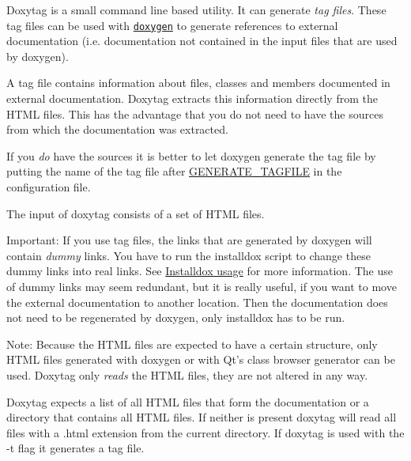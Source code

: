 Doxytag is a small command line based utility. It can generate {\itshape tag files\/}. These tag files can be used with \href{doxygen_usage.html}{\tt doxygen} to generate references to external documentation (i.e. documentation not contained in the input files that are used by doxygen).

A tag file contains information about files, classes and members documented in external documentation. Doxytag extracts this information directly from the HTML files. This has the advantage that you do not need to have the sources from which the documentation was extracted.

If you {\itshape do\/} have the sources it is better to let {\ttfamily doxygen} generate the tag file by putting the name of the tag file after \hyperlink{config_cfg_generate_tagfile}{GENERATE\_\-TAGFILE} in the configuration file.

The input of doxytag consists of a set of HTML files.

\begin{DoxyParagraph}{Important:}
If you use tag files, the links that are generated by doxygen will contain {\itshape dummy\/} links. You have to run the {\ttfamily installdox} script to change these dummy links into real links. See \hyperlink{installdox_usage}{Installdox usage} for more information. The use of dummy links may seem redundant, but it is really useful, if you want to move the external documentation to another location. Then the documentation does not need to be regenerated by {\ttfamily doxygen}, only {\ttfamily installdox} has to be run.
\end{DoxyParagraph}
\begin{DoxyParagraph}{Note: }
Because the HTML files are expected to have a certain structure, only HTML files generated with doxygen or with Qt's class browser generator can be used. Doxytag only {\itshape reads\/} the HTML files, they are not altered in any way.
\end{DoxyParagraph}
Doxytag expects a list of all HTML files that form the documentation or a directory that contains all HTML files. If neither is present doxytag will read all files with a {\ttfamily .html} extension from the current directory. If doxytag is used with the {\ttfamily -\/t} flag it generates a tag file.

